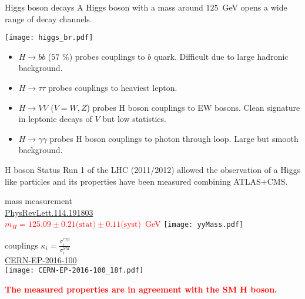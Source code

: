 \begin{frame}{Higgs boson decays}
  A Higgs boson with a mass around $125$~GeV opens a wide range of decay channels.
  
  \begin{minipage}{0.49\linewidth}
    \centering
    \texttt{[image: higgs\_br.pdf]}
  \end{minipage}
  \hfill
  \begin{minipage}{0.49\linewidth}
    \begin{itemize}
    \item $H\rightarrow bb$ ($57$ \%) probes couplings to $b$ quark.
      Difficult due to large hadronic background.
    \item $H\rightarrow \tau\tau$ probes couplings to heaviest lepton.
    \item $H\rightarrow VV$ ($V=W,Z$) probes H boson couplings to EW bosons.
      Clean signature in leptonic decays of $V$ but low statistics.
    \item $H\rightarrow\gamma\gamma$ probes H boson couplings to photon through loop.
      Large but smooth background.
    \end{itemize}
  \end{minipage}
  
\end{frame}
\begin{frame}{H boson Status}
  Run 1 of the LHC (2011/2012) allowed the observation of a Higgs like particles and its properties have been measured combining ATLAS+CMS.
  \vfill
  \begin{minipage}[t]{0.49\linewidth}
    \centering
    mass measurement \\  \href{http://journals.aps.org/prl/pdf/10.1103/PhysRevLett.114.191803}{PhysRevLett.114.191803}\\
    \textcolor{red}{$m_H = 125.09 \pm 0.21 \text{(stat)} \pm 0.11 \text{(syst)} $~GeV}  
    \texttt{[image: yyMass.pdf]}
  \end{minipage}
  \hfill
  \begin{minipage}[t]{0.49\linewidth}
    \centering
    couplings $\kappa_i =\frac{\sigma_i^{exp}}{\sigma_i^{SM}}$ \\
    \href{https://cds.cern.ch/record/2158863}{CERN-EP-2016-100} \\
    \vfill
    \texttt{[image: CERN-EP-2016-100\_18f.pdf]} 
  \end{minipage}
\textcolor{red}{\bf The measured properties are in agreement with the SM H boson.}
\end{frame}
